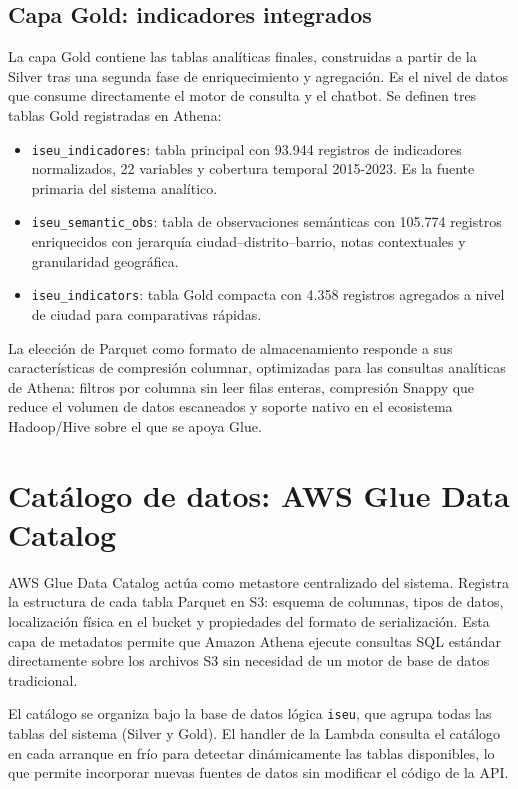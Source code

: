 \subsection{Capa Gold: indicadores integrados}

La capa Gold contiene las tablas analíticas finales, construidas a partir de la Silver tras una segunda fase de enriquecimiento y agregación. Es el nivel de datos que consume directamente el motor de consulta y el chatbot. Se definen tres tablas Gold registradas en Athena:

\begin{itemize}
  \item \texttt{iseu\_indicadores}: tabla principal con 93.944 registros de indicadores normalizados, 22 variables y cobertura temporal 2015-2023. Es la fuente primaria del sistema analítico.
  \item \texttt{iseu\_semantic\_obs}: tabla de observaciones semánticas con 105.774 registros enriquecidos con jerarquía ciudad--distrito--barrio, notas contextuales y granularidad geográfica.
  \item \texttt{iseu\_indicators}: tabla Gold compacta con 4.358 registros agregados a nivel de ciudad para comparativas rápidas.
\end{itemize}

La elección de Parquet como formato de almacenamiento responde a sus características de compresión columnar, optimizadas para las consultas analíticas de Athena: filtros por columna sin leer filas enteras, compresión Snappy que reduce el volumen de datos escaneados y soporte nativo en el ecosistema Hadoop/Hive sobre el que se apoya Glue.

\section{Catálogo de datos: AWS Glue Data Catalog}

AWS Glue Data Catalog actúa como metastore centralizado del sistema. Registra la estructura de cada tabla Parquet en S3: esquema de columnas, tipos de datos, localización física en el bucket y propiedades del formato de serialización. Esta capa de metadatos permite que Amazon Athena ejecute consultas SQL estándar directamente sobre los archivos S3 sin necesidad de un motor de base de datos tradicional.

El catálogo se organiza bajo la base de datos lógica \texttt{iseu}, que agrupa todas las tablas del sistema (Silver y Gold). El handler de la Lambda consulta el catálogo en cada arranque en frío para detectar dinámicamente las tablas disponibles, lo que permite incorporar nuevas fuentes de datos sin modificar el código de la API.

